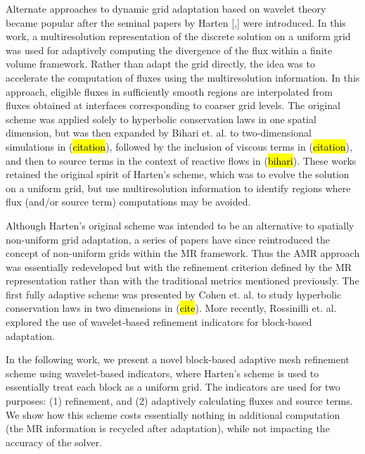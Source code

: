 \documentclass[]{article}
\begin{document}
    Alternate approaches to dynamic grid adaptation based on wavelet theory
    became popular after the seminal papers by Harten [\cite{harten1994},] were
    introduced. In this work, a multiresolution representation of the discrete
    solution on a uniform grid was used for adaptively computing the divergence
    of the flux within a finite volume framework. Rather than adapt the grid
    directly, the idea was to accelerate the computation of fluxes using the
    multiresolution information. In this approach, eligible fluxes in
    sufficiently smooth regions are interpolated from fluxes obtained at
    interfaces corresponding to coarser grid levels. The original scheme was
    applied solely to hyperbolic conservation laws in one spatial dimension, but
    was then expanded by Bihari et. al. to two-dimensional simulations in
    (\hl{citation}), followed by the inclusion of viscous terms in
    (\hl{citation}), and then to source terms in the context of reactive flows
    in (\hl{bihari}). These works retained the original spirit of Harten's
    scheme, which was to evolve the solution on a uniform grid, but use
    multiresolution information to identify regions where flux (and/or source
    term) computations may be avoided.

    Although Harten's original scheme was intended to be an alternative to
    spatially non-uniform grid adaptation, a series of papers have since
    reintroduced the concept of non-uniform grids within the MR framework. Thus
    the AMR approach was essentially redeveloped but with the refinement
    criterion defined by the MR representation rather than with the traditional
    metrics mentioned previously. The first fully adaptive scheme was presented
    by Cohen et. al. to study hyperbolic conservation laws in two dimensions in
    (\hl{cite}). More recently, Rossinilli et. al. explored the use of
    wavelet-based refinement indicators for block-based adaptation.

    In the following work, we present a novel block-based adaptive mesh
    refinement scheme using wavelet-based indicators, where Harten's scheme is
    used to essentially treat each block as a uniform grid.  The indicators are
    used for two purposes: (1) refinement, and (2) adaptively calculating fluxes
    and source terms. We show how this scheme costs essentially nothing in
    additional computation (the MR information is recycled after adaptation),
    while not impacting the accuracy of the solver.
\end{document}
